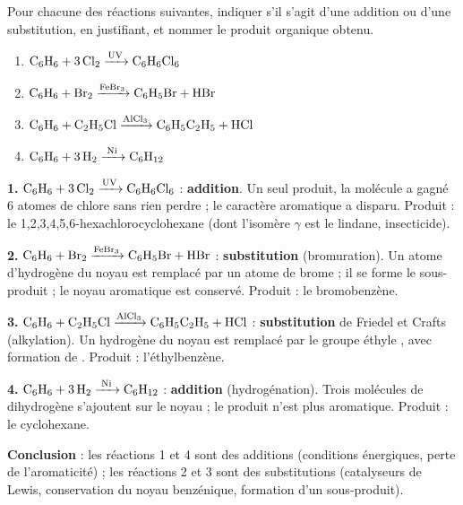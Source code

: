 \documentclass[11pt]{article}
\begin{document}
\begin{exoresolu}
Pour chacune des réactions suivantes, indiquer s'il s'agit d'une addition ou d'une substitution, en justifiant, et nommer le produit organique obtenu.
\begin{enumerate}
\item $\ce{C6H6 + 3 Cl2 ->[UV] C6H6Cl6}$
\item $\ce{C6H6 + Br2 ->[FeBr3] C6H5Br + HBr}$
\item $\ce{C6H6 + C2H5Cl ->[AlCl3] C6H5C2H5 + HCl}$
\item $\ce{C6H6 + 3 H2 ->[Ni] C6H12}$
\end{enumerate}
\tcblower
\textbf{1.} $\ce{C6H6 + 3 Cl2 ->[UV] C6H6Cl6}$ : \textbf{addition}. Un seul produit, la molécule a gagné 6 atomes de chlore sans rien perdre ; le caractère aromatique a disparu. Produit : le 1,2,3,4,5,6-hexachlorocyclohexane (dont l'isomère $\gamma$ est le lindane, insecticide).

\textbf{2.} $\ce{C6H6 + Br2 ->[FeBr3] C6H5Br + HBr}$ : \textbf{substitution} (bromuration). Un atome d'hydrogène du noyau est remplacé par un atome de brome ; il se forme le sous-produit  ; le noyau aromatique est conservé. Produit : le bromobenzène.

\textbf{3.} $\ce{C6H6 + C2H5Cl ->[AlCl3] C6H5C2H5 + HCl}$ : \textbf{substitution} de Friedel et Crafts (alkylation). Un hydrogène du noyau est remplacé par le groupe éthyle , avec formation de . Produit : l'éthylbenzène.

\textbf{4.} $\ce{C6H6 + 3 H2 ->[Ni] C6H12}$ : \textbf{addition} (hydrogénation). Trois molécules de dihydrogène s'ajoutent sur le noyau ; le produit n'est plus aromatique. Produit : le cyclohexane.

\textbf{Conclusion} : les réactions 1 et 4 sont des additions (conditions énergiques, perte de l'aromaticité) ; les réactions 2 et 3 sont des substitutions (catalyseurs de Lewis, conservation du noyau benzénique, formation d'un sous-produit).
\end{exoresolu}
\end{document}
